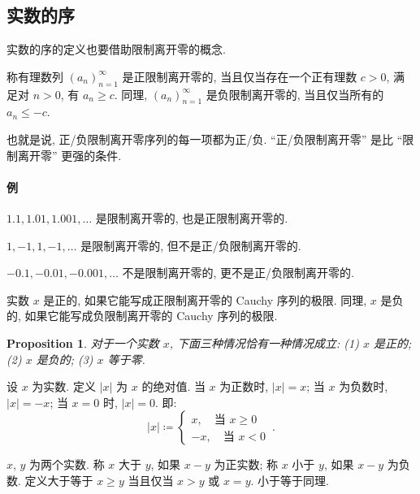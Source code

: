\documentclass[UTF8]{ctexart}
\theoremstyle{mystyle}
\newtheorem{proposition}{Proposition}[section]
\theoremstyle{myremark}
\theoremstyle{plain}
\begin{document}
\subsection{实数的序}
实数的序的定义也要借助限制离开零的概念.

\begin{definition}
    称有理数列 $ (a_n)_{n = 1}^\infty $ 是正限制离开零的, 当且仅当存在一个正有理数 $ c > 0 $, 满足对 $ n > 0 $, 有 $ a_n \geqslant c $. 同理, $ (a_n)_{n = 1}^\infty $ 是负限制离开零的, 当且仅当所有的 $ a_n \leqslant -c $.
\end{definition}

也就是说, 正/负限制离开零序列的每一项都为正/负. ``正/负限制离开零'' 是比 ``限制离开零'' 更强的条件.

\paragraph{例}
$ 1.1, 1.01, 1.001, \dots $ 是限制离开零的, 也是正限制离开零的.

$ 1, -1, 1, -1, \dots $ 是限制离开零的, 但不是正/负限制离开零的.

$ -0.1, -0.01, -0.001, \dots $ 不是限制离开零的, 更不是正/负限制离开零的.

\begin{definition}
    实数 $ x $ 是正的, 如果它能写成正限制离开零的 Cauchy 序列的极限. 同理, $ x $ 是负的, 如果它能写成负限制离开零的 Cauchy 序列的极限.
\end{definition}

\begin{proposition}
    对于一个实数 $ x $, 下面三种情况恰有一种情况成立: (1) $ x $ 是正的; (2) $ x $ 是负的; (3) $ x $ 等于零.
\end{proposition}

\begin{definition}
    设 $ x $ 为实数. 定义 $ |x| $ 为 $ x $ 的绝对值. 当 $ x $ 为正数时, $ |x| = x $; 当 $ x $ 为负数时, $ |x| = -x $; 当 $ x = 0 $ 时, $ |x| = 0 $. 即: \[ |x| \coloneqq \begin{cases}
        x, \quad \text{当 } x \geqslant 0 \\
        -x, \quad \text{当 } x < 0
    \end{cases} \,.\]
\end{definition}

\begin{definition}
    $ x $, $ y $ 为两个实数. 称 $ x $ 大于 $ y $, 如果 $ x - y $ 为正实数; 称 $ x $ 小于 $ y $, 如果 $ x - y $ 为负数. 定义大于等于 $ x \geqslant y $ 当且仅当 $ x > y $ 或 $ x = y $. 小于等于同理.
\end{definition}
\end{document}
